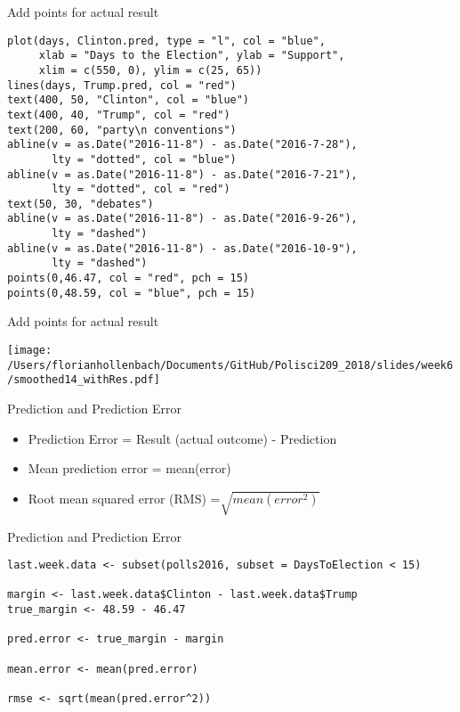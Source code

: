 \documentclass[presentation]{beamer}
\begin{document}
\begin{frame}[fragile,shrink=25,label={sec:orgb7dd346}]{Add points for actual result}
 \begin{verbatim}
plot(days, Clinton.pred, type = "l", col = "blue",
     xlab = "Days to the Election", ylab = "Support",
     xlim = c(550, 0), ylim = c(25, 65))
lines(days, Trump.pred, col = "red")
text(400, 50, "Clinton", col = "blue")
text(400, 40, "Trump", col = "red")
text(200, 60, "party\n conventions")
abline(v = as.Date("2016-11-8") - as.Date("2016-7-28"),
       lty = "dotted", col = "blue")
abline(v = as.Date("2016-11-8") - as.Date("2016-7-21"),
       lty = "dotted", col = "red")
text(50, 30, "debates")
abline(v = as.Date("2016-11-8") - as.Date("2016-9-26"),
       lty = "dashed")
abline(v = as.Date("2016-11-8") - as.Date("2016-10-9"),
       lty = "dashed")
points(0,46.47, col = "red", pch = 15)
points(0,48.59, col = "blue", pch = 15)
\end{verbatim}
\end{frame}



\begin{frame}[label={sec:org7e0b2fd}]{Add points for actual result}
\begin{center}
\texttt{[image: /Users/florianhollenbach/Documents/GitHub/Polisci209\_2018/slides/week6/smoothed14\_withRes.pdf]}
\end{center}
\end{frame}


\begin{frame}[label={sec:org1c86832}]{Prediction and Prediction Error}
\begin{itemize}
\item Prediction Error = Result (actual outcome) - Prediction
\item Mean prediction error = mean(error)
\item Root mean squared error (RMS) =\(\sqrt{mean(error^2)}\)
\end{itemize}
\end{frame}

\begin{frame}[fragile,shrink=25,label={sec:org8a61f74}]{Prediction and Prediction Error}
 \begin{verbatim}
last.week.data <- subset(polls2016, subset = DaysToElection < 15)

margin <- last.week.data$Clinton - last.week.data$Trump
true_margin <- 48.59 - 46.47

pred.error <- true_margin - margin

mean.error <- mean(pred.error)

rmse <- sqrt(mean(pred.error^2))
\end{verbatim}
\end{frame}
\end{document}
